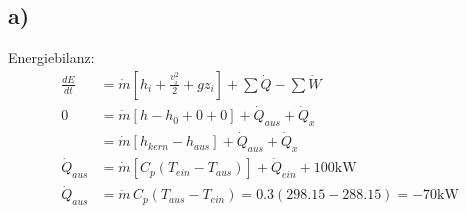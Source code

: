

\subsection*{a)}
Energiebilanz:
\begin{align*}
\frac{dE}{dt} &= \dot{m} \left[ h_i + \frac{v_i^2}{2} + g z_i \right] + \sum \dot{Q} - \sum \dot{W} \\
0 &= \dot{m} \left[ h - h_0 + 0 + 0 \right] + \dot{Q}_{aus} + \dot{Q}_x \\
&= \dot{m} \left[ h_{kern} - h_{aus} \right] + \dot{Q}_{aus} + \dot{Q}_x \\
\dot{Q}_{aus} &= \dot{m} \left[ C_p (T_{ein} - T_{aus}) \right] + \dot{Q}_{ein} + 100 \text{kW} \\
\dot{Q}_{aus} &= \dot{m} \, C_p (T_{aus} - T_{ein}) = 0.3 (298.15 - 288.15) = -70 \text{kW}
\end{align*}
